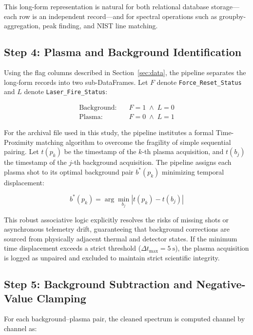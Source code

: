 \documentclass[a4paper,twocolumn,10pt]{article}
\begin{document}
This long-form representation is natural for both relational database
storage---each row is an independent record---and for spectral
operations such as groupby-aggregation, peak finding, and NIST line
matching.

\subsection{Step 4: Plasma and Background Identification}

Using the flag columns described in Section~\ref{sec:data}, the
pipeline separates the long-form records into two sub-DataFrames.
Let $F$ denote \texttt{Force\_Reset\_Status} and $L$ denote
\texttt{Laser\_Fire\_Status}:

\begin{align}
\label{eq:bg_mask}
\text{Background:}\quad & F = 1 \;\wedge\; L = 0 \\
\label{eq:plasma_mask}
\text{Plasma:}\quad & F = 0 \;\wedge\; L = 1
\end{align}

For the archival file used in this study, the pipeline institutes a formal
Time-Proximity matching algorithm to overcome the fragility of simple sequential
pairing. Let $t(p_k)$ be the timestamp of the $k$-th plasma acquisition, and
$t(b_j)$ the timestamp of the $j$-th background acquisition. The pipeline
assigns each plasma shot to its optimal background pair $b^*(p_k)$ minimizing
temporal displacement:

\begin{equation}
\label{eq:proximity_pairing}
b^*(p_k) = \arg\min_{b_j} | t(p_k) - t(b_j) | 
\end{equation}

This robust associative logic explicitly resolves the risks of missing shots
or asynchronous telemetry drift, guaranteeing that background corrections
are sourced from physically adjacent thermal and detector states. If the 
minimum time displacement exceeds a strict threshold ($\Delta t_{\text{max}} = \SI{5}{\second}$), 
the plasma acquisition is logged as unpaired and excluded to maintain strict
scientific integrity.

\subsection{Step 5: Background Subtraction and Negative-Value Clamping}

For each background--plasma pair, the cleaned spectrum is computed
channel by channel as:
\end{document}
